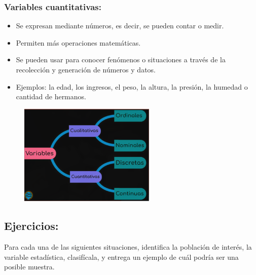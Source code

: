 \documentclass[12pt, letterpaper]{article}
\begin{document}
\subsubsection{Variables cuantitativas:} %
\begin{itemize}
    \item Se expresan mediante números, es decir, se pueden contar o medir.
    \item Permiten más operaciones matemáticas.
    \item Se pueden usar para conocer fenómenos o situaciones a través de la recolección y generación de números y datos.
    \item Ejemplos: la edad, los ingresos, el peso, la altura, la presión, la humedad o cantidad de hermanos.
\end{itemize}

\begin{figure}[htbp]
    \centering
    \includegraphics[width=0.58\textwidth]{variables}
    \caption{}\label{fig:}
\end{figure}


\subsection{Ejercicios:}
Para cada una de las siguientes situaciones, identifica la población de interés, la variable estadística, clasifícala, y entrega un ejemplo de cuál podría ser una posible muestra.
\end{document}
